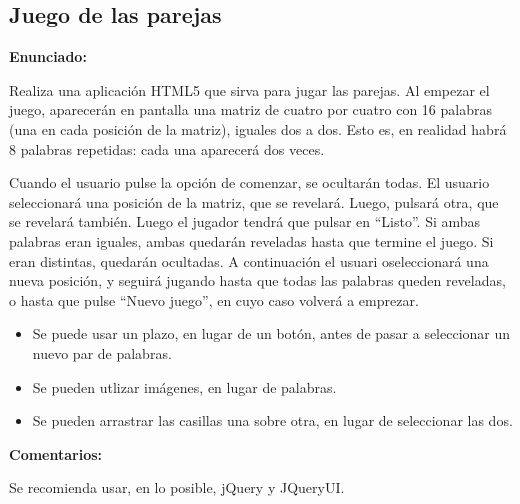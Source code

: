 \subsection{Juego de las parejas}
\label{subsec:finales-parejas}

\textbf{Enunciado:}

Realiza una aplicación HTML5 que sirva para jugar las parejas. Al empezar el juego, aparecerán en pantalla una matriz de cuatro por cuatro con 16 palabras (una en cada posición de la matriz), iguales dos a dos. Esto es, en realidad habrá 8 palabras repetidas: cada una aparecerá dos veces.

Cuando el usuario pulse la opción de comenzar, se ocultarán todas. El usuario seleccionará una posición de la matriz, que se revelará. Luego, pulsará otra, que se revelará también. Luego el jugador tendrá que pulsar en ``Listo''. Si ambas palabras eran iguales, ambas quedarán reveladas hasta que termine el juego. Si eran distintas, quedarán ocultadas. A continuación el usuari oseleccionará una nueva posición, y seguirá jugando hasta que todas las palabras queden reveladas, o hasta que pulse ``Nuevo juego'', en cuyo caso volverá a emprezar.

\begin{itemize}
\item Se puede usar un plazo, en lugar de un botón, antes de pasar a seleccionar un nuevo par de palabras.
\item Se pueden utlizar imágenes, en lugar de palabras.
\item Se pueden arrastrar las casillas una sobre otra, en lugar de seleccionar las dos.
\end{itemize}


\textbf{Comentarios:}

Se recomienda usar, en lo posible, jQuery y JQueryUI.


